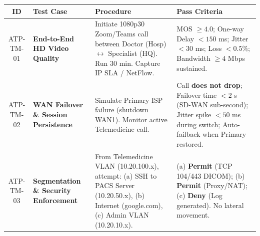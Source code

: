 \documentclass[11pt]{article}
\begin{document}
\begin{exoresolu}
\begin{center}
\begin{tabularx}{\linewidth}{|c|X|X|X|}
\hline
\rowcolor{popblueL}
\textbf{ID} & \textbf{Test Case} & \textbf{Procedure} & \textbf{Pass Criteria} \\
\hline
ATP-TM-01 & \textbf{End-to-End HD Video Quality} & Initiate 1080p30 Zoom/Teams call between Doctor (Hosp) $\leftrightarrow$ Specialist (HQ). Run $30$ min. Capture IP SLA / NetFlow. & MOS $\ge 4.0$; One-way Delay $< 150$ ms; Jitter $< 30$ ms; Loss $< 0.5\%$; Bandwidth $\ge 4$ Mbps sustained. \\
\hline
ATP-TM-02 & \textbf{WAN Failover \& Session Persistence} & Simulate Primary ISP failure (shutdown WAN1). Monitor active Telemedicine call. & Call \textbf{does not drop}; Failover time $< 2$ s (SD-WAN sub-second); Jitter spike $< 50$ ms during switch; Auto-failback when Primary restored. \\
\hline
ATP-TM-03 & \textbf{Segmentation \& Security Enforcement} & From Telemedicine VLAN (10.20.100.x), attempt: (a) SSH to PACS Server (10.20.50.x), (b) Internet (google.com), (c) Admin VLAN (10.20.10.x). & (a) \textbf{Permit} (TCP 104/443 DICOM); (b) \textbf{Permit} (Proxy/NAT); (c) \textbf{Deny} (Log generated). No lateral movement. \\
\hline
\end{tabularx}
\end{center}


\end{exoresolu}
\end{document}

